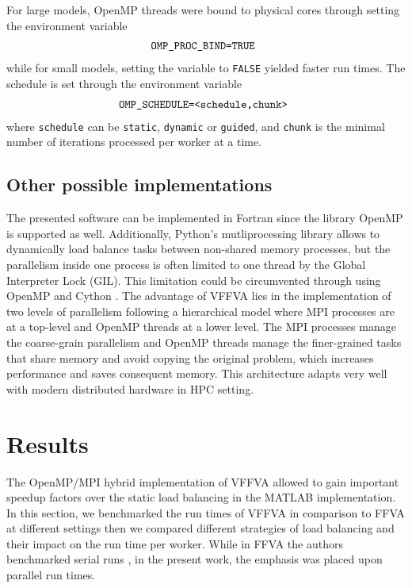 For large models, OpenMP threads were bound to physical cores through setting the environment variable 
\begin{equation*} \label{eq:one}
\begin{array}{ll@{}ll}
\texttt{OMP\_PROC\_BIND=TRUE} &\\
\end{array}
\end{equation*}
while for small models, setting the variable to \texttt{FALSE}  yielded faster run times.
The schedule is set through the environment variable
\begin{equation*} \label{eq:one}
\begin{array}{ll@{}ll}
\texttt{OMP\_SCHEDULE=<schedule,chunk>} &\\
\end{array}
\end{equation*}
where \texttt{schedule} can be \texttt{static}, \texttt{dynamic} or \texttt{guided}, and \texttt{chunk} is the minimal number of iterations processed per worker at a time.
\subsection{Other possible implementations}
The presented software can be implemented in Fortran since the library OpenMP is supported as well. Additionally, Python's mutliprocessing library allows to dynamically load balance tasks between non-shared memory processes, but the parallelism inside one process is often limited to one thread by the Global Interpreter Lock (GIL). This limitation could be circumvented through using OpenMP and Cython \cite{behnel2011cython}. The advantage of VFFVA lies in the implementation of two levels of parallelism following a hierarchical model where MPI processes are at a top-level and OpenMP threads at a lower level. The MPI processes manage the coarse-grain parallelism and OpenMP threads manage the finer-grained tasks that share memory and avoid copying the original problem, which increases performance and saves consequent memory. This architecture adapts very well with modern distributed hardware in HPC setting.\\
\section{Results}
The OpenMP/MPI hybrid implementation of VFFVA allowed to gain important speedup factors over the static load balancing in the MATLAB implementation. In this section, we benchmarked the run times of VFFVA in comparison to FFVA at different settings then we compared different strategies of load balancing and their impact on the run time per worker. While in FFVA the authors benchmarked serial runs \cite{gudmundsson2010computationally}, in the present work, the emphasis was placed upon parallel run times.
